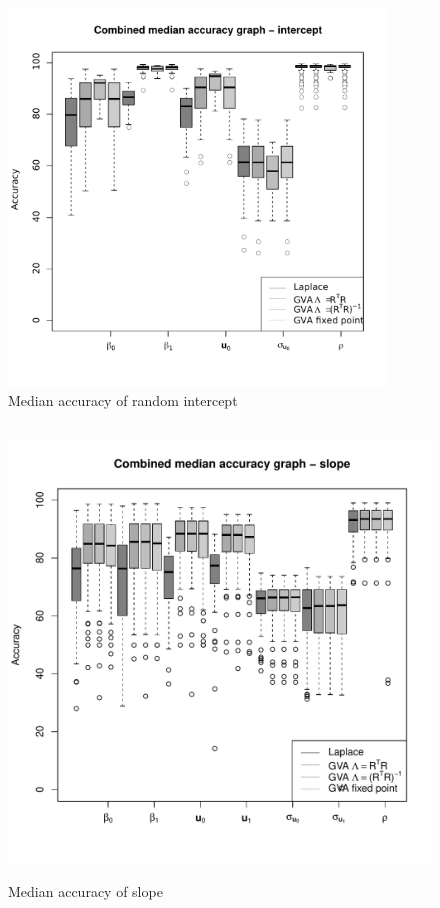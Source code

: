 \documentclass{article}[12pt]
\begin{document}
\begin{figure}
\caption{Median accuracy of random intercept}
\label{fig:median_accuracy_intercept}
\includegraphics[width=100mm, height=100mm]{code/results/median_accuracy_combined_intercept.pdf}
\end{figure}

\begin{figure}
\caption{Median accuracy of slope}
\label{fig:median_accuracy_slope}
\includegraphics[width=120mm, height=120mm]{code/results/median_accuracy_combined_slope.pdf}
\end{figure}
\end{document}
